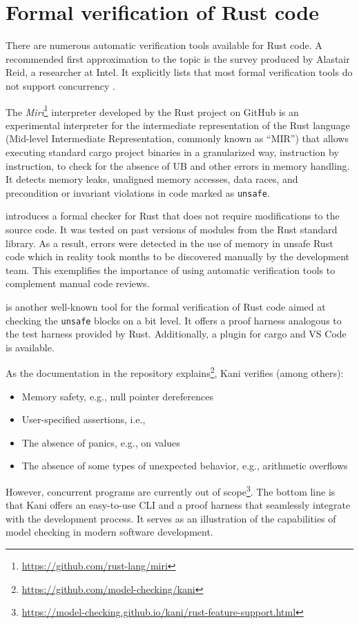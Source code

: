 \section{Formal verification of Rust code}

There are numerous automatic verification tools available for Rust code.
A recommended first approximation to the topic is
the survey produced by Alastair Reid, a researcher at Intel.
It explicitly lists that most formal verification tools
do not support concurrency \cite{reid2021}.

The \emph{Miri}\footnote{\url{https://github.com/rust-lang/miri}} interpreter
developed by the Rust project on GitHub is an experimental interpreter
for the intermediate representation of the Rust language
(Mid-level Intermediate Representation, commonly known as ``\acrshort{MIR}'')
that allows executing standard cargo project binaries
in a granularized way, instruction by instruction,
to check for the absence of \acrfull{UB}
and other errors in memory handling.
It detects memory leaks, unaligned memory accesses, data races,
and precondition or invariant violations in code marked as \texttt{unsafe}.

\cite{toman2015crust} introduces a formal checker for Rust
that does not require modifications to the source code.
It was tested on past versions of modules from the Rust standard library.
As a result, errors were detected in the use of memory in unsafe Rust code
which in reality took months to be discovered manually by the development team.
This exemplifies the importance of using automatic verification tools
to complement manual code reviews.

\cite{kani2023} is another well-known tool for the formal verification of Rust code
aimed at checking the \texttt{unsafe} blocks on a bit level.
It offers a proof harness analogous to the test harness provided by Rust.
Additionally, a plugin for cargo and VS Code is available.

As the documentation in the repository explains\footnote{\url{https://github.com/model-checking/kani}}, Kani verifies (among others):

\begin{itemize}
  \item Memory safety, e.g., null pointer dereferences
  \item User-specified assertions, i.e., 
  \item The absence of panics, e.g.,  on  values
  \item The absence of some types of unexpected behavior, e.g., arithmetic overflows
\end{itemize}

However, concurrent programs are currently out of scope\footnote{\url{https://model-checking.github.io/kani/rust-feature-support.html}}.
The bottom line is that Kani offers an easy-to-use \acrshort{CLI} and a proof harness
that seamlessly integrate with the development process.
It serves as an illustration of the capabilities of model checking in modern software development.
